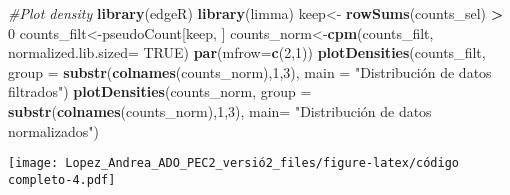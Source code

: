 \documentclass[
]{article}
\newenvironment{Shaded}{\begin{snugshade}}{\end{snugshade}}
\newcommand{\CommentTok}[1]{\textcolor[rgb]{0.56,0.35,0.01}{\textit{#1}}}
\newcommand{\DataTypeTok}[1]{\textcolor[rgb]{0.13,0.29,0.53}{#1}}
\newcommand{\DecValTok}[1]{\textcolor[rgb]{0.00,0.00,0.81}{#1}}
\newcommand{\FloatTok}[1]{\textcolor[rgb]{0.00,0.00,0.81}{#1}}
\newcommand{\KeywordTok}[1]{\textcolor[rgb]{0.13,0.29,0.53}{\textbf{#1}}}
\newcommand{\NormalTok}[1]{#1}
\newcommand{\OperatorTok}[1]{\textcolor[rgb]{0.81,0.36,0.00}{\textbf{#1}}}
\newcommand{\OtherTok}[1]{\textcolor[rgb]{0.56,0.35,0.01}{#1}}
\newcommand{\StringTok}[1]{\textcolor[rgb]{0.31,0.60,0.02}{#1}}
\begin{document}
\begin{Shaded}
\begin{Highlighting}[]
\CommentTok{#Plot density}
\KeywordTok{library}\NormalTok{(edgeR)}
\KeywordTok{library}\NormalTok{(limma)}
\NormalTok{keep<-}\StringTok{ }\KeywordTok{rowSums}\NormalTok{(counts_sel) }\OperatorTok{>}\StringTok{ }\DecValTok{0}
\NormalTok{counts_filt<-pseudoCount[keep, ]}
\NormalTok{counts_norm<-}\KeywordTok{cpm}\NormalTok{(counts_filt, }\DataTypeTok{normalized.lib.sized=} \OtherTok{TRUE}\NormalTok{)}
\KeywordTok{par}\NormalTok{(}\DataTypeTok{mfrow=}\KeywordTok{c}\NormalTok{(}\DecValTok{2}\NormalTok{,}\DecValTok{1}\NormalTok{))}
\KeywordTok{plotDensities}\NormalTok{(counts_filt, }\DataTypeTok{group =} \KeywordTok{substr}\NormalTok{(}\KeywordTok{colnames}\NormalTok{(counts_norm),}\DecValTok{1}\NormalTok{,}\DecValTok{3}\NormalTok{), }\DataTypeTok{main =} \StringTok{"Distribución de datos filtrados"}\NormalTok{)}
\KeywordTok{plotDensities}\NormalTok{(counts_norm, }\DataTypeTok{group =} \KeywordTok{substr}\NormalTok{(}\KeywordTok{colnames}\NormalTok{(counts_norm),}\DecValTok{1}\NormalTok{,}\DecValTok{3}\NormalTok{), }\DataTypeTok{main=} \StringTok{"Distribución de datos normalizados"}\NormalTok{)}
\end{Highlighting}
\end{Shaded}

\texttt{[image: Lopez\_Andrea\_ADO\_PEC2\_versió2\_files/figure-latex/código completo-4.pdf]}

\begin{Shaded}
\end{Shaded}
\end{document}
